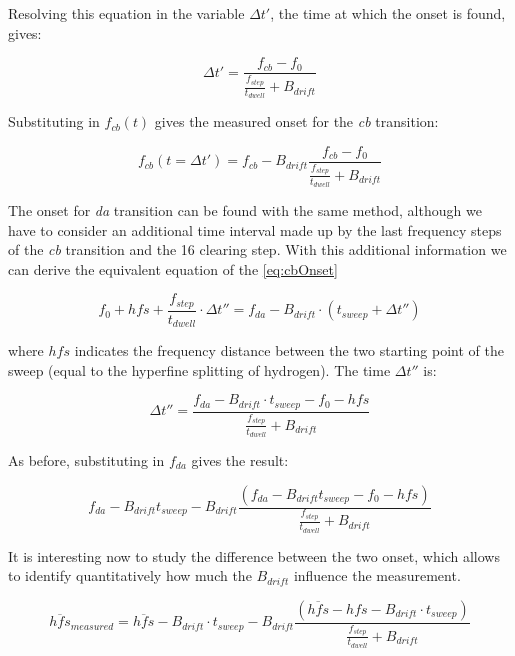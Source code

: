 \documentclass[11pt,a4paper,oneside]{article}
\begin{document}
Resolving this equation in the variable $\Delta t'$, the time at which the onset is found, gives:

\begin{equation}
\Delta t' = \dfrac{f_{cb} - f_{0}}{ \frac{f_{step}}{t_{dwell}} + B_{drift}}
\end{equation}

Substituting in $f_{cb}(t)$ gives the measured onset for the \textit{cb} transition:

\begin{equation}
f_{cb}(t = \Delta t') = f_{cb} - B_{drift} \dfrac{f_{cb} - f_{0}}{ \frac{f_{step}}{t_{dwell}} + B_{drift}}
\end{equation} 

The onset for \textit{da} transition can be found with the same method, although we have to consider an additional time interval made up by the last frequency steps of the \textit{cb} transition and the 16 clearing step. With this additional information we can derive the equivalent equation of the \ref{eq:cbOnset}

\begin{equation}
f_{0} + hfs +  \dfrac{f_{step}}{t_{dwell}} \cdot \Delta t'' = f_{da} -B_{drift} \cdot (t_{sweep} + \Delta t'') 
\end{equation}

where $hfs$ indicates the frequency distance between the two starting point of the sweep (equal to the hyperfine splitting of hydrogen). The time $\Delta t''$ is:

\begin{equation}
\Delta t'' = \dfrac{f_{da} - B_{drift} \cdot t_{sweep} - f_{0} - hfs}{ \frac{f_{step}}{t_{dwell}} + B_{drift}}
\end{equation} 

As before, substituting in $f_{da}$ gives the result:

\begin{equation}
f_{da} - B_{drift} t_{sweep} - B_{drift} \dfrac{( f_{da} - B_{drift} t_{sweep} - f_{0} - hfs)}{ \frac{f_{step}}{t_{dwell}} + B_{drift}}
\end{equation}

It is interesting now to study the difference between the two onset, which allows to identify quantitatively how much the $B_{drift}$ influence the measurement. 

\begin{equation} \label{eq:Systematiceffect}
\overline{hfs}_{measured} = \overline{hfs} - B_{drift} \cdot t_{sweep} - B_{drift}  \dfrac{(\overline{hfs} - hfs - B_{drift} \cdot t_{sweep})}{ \frac{f_{step}}{t_{dwell}} + B_{drift}}
\end{equation}
\end{document}
